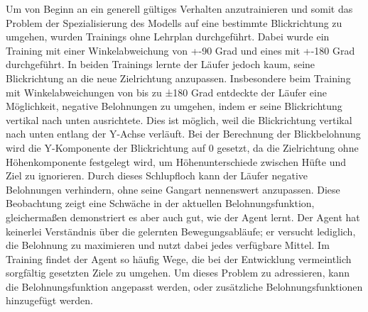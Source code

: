 Um von Beginn an ein generell gültiges Verhalten anzutrainieren und somit das Problem der Spezialisierung des Modells auf eine bestimmte Blickrichtung zu umgehen, wurden Trainings ohne Lehrplan durchgeführt. Dabei wurde ein Training mit einer Winkelabweichung von +-90 Grad und eines mit +-180 Grad durchgeführt. In beiden Trainings lernte der Läufer jedoch kaum, seine Blickrichtung an die neue Zielrichtung anzupassen. Insbesondere beim Training mit Winkelabweichungen von bis zu ±180 Grad entdeckte der Läufer eine Möglichkeit, negative Belohnungen zu umgehen, indem er seine Blickrichtung vertikal nach unten ausrichtete. Dies ist möglich, weil die Blickrichtung vertikal nach unten entlang der Y-Achse verläuft. Bei der Berechnung der Blickbelohnung wird die Y-Komponente der Blickrichtung auf 0 gesetzt, da die Zielrichtung ohne Höhenkomponente festgelegt wird, um Höhenunterschiede zwischen Hüfte und Ziel zu ignorieren. Durch dieses Schlupfloch kann der Läufer negative Belohnungen verhindern, ohne seine Gangart nennenswert anzupassen. Diese Beobachtung zeigt eine Schwäche in der aktuellen Belohnungsfunktion, gleichermaßen demonstriert es aber auch gut, wie der Agent lernt. Der Agent hat keinerlei Verständnis über die gelernten Bewegungsabläufe; er versucht lediglich, die Belohnung zu maximieren und nutzt dabei jedes verfügbare Mittel. Im Training findet der Agent so häufig Wege, die bei der Entwicklung vermeintlich sorgfältig gesetzten Ziele zu umgehen. Um dieses Problem zu adressieren, kann die Belohnungsfunktion angepasst werden, oder zusätzliche Belohnungsfunktionen hinzugefügt werden.


